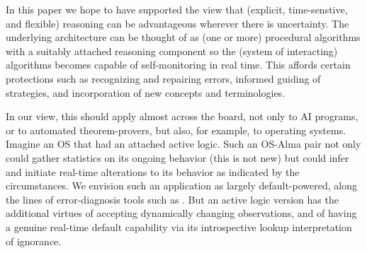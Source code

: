 
In this paper we hope to have supported the view that (explicit,
time-senstive, and flexible)
reasoning can be advantageous wherever there is uncertainty.  The
underlying architecture can be thought of as (one or more) procedural
algorithms with a suitably attached reasoning component
so the (system of interacting) algorithms becomes capable
of self-monitoring in real time. This affords certain protections
such as recognizing and repairing errors, informed guiding of
strategies, and incorporation of new concepts and terminologies.

In our view, this should apply almost across the board, not only to AI
programs, or to automated theorem-provers, but also, for example, to
operating systems.  Imagine an OS that had an attached active logic.
Such an OS-Alma pair not only could gather statistics on its ongoing
behavior (this is not new) but could infer and initiate real-time
alterations to its behavior as indicated by the circumstances. We
envision such an application as largely default-powered, along the
lines of error-diagnosis tools such as \cite{reiter-dekleer}. But an
active logic version has the additional virtues of accepting
dynamically changing observations, and of having a genuine real-time
default capability via its introspective lookup interpretation of
ignorance.



